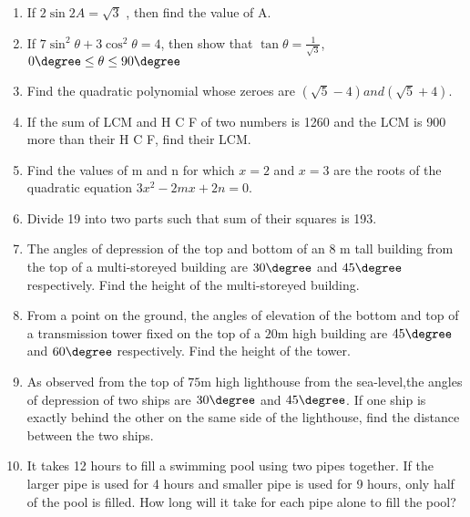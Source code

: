 \documentclass{article}
\begin{document}
\begin{enumerate}
\item If $2\sin2A=\sqrt{3}$ , then find the value of A.
\item If $7\sin^2\theta + 3\cos^2\theta = 4$, then show that $\tan\theta= \frac{1}{\sqrt{3}}$, $0\degree \le \theta\le 90\degree$

\item Find the quadratic polynomial whose zeroes are $(\sqrt{5}-4) and (\sqrt{5}+4)$.

\item If the sum of LCM and H C F of two numbers is 1260 and the LCM is 900 more than their H C F, find their LCM.

\item Find the values of m and n for which $x=2$ and $x=3$ are the roots of the quadratic equation $3x^2-2mx+2n=0$.

\item Divide 19 into two parts such that sum of their squares is 193.

\item The angles of depression of the top and bottom of an $8$ m tall building from the top of a multi-storeyed building are $30\degree$ and $45\degree$ respectively. Find the height of the multi-storeyed building.

\item From a point on the ground, the angles of elevation of the bottom and top of a transmission tower fixed on the top of a $20$m high building are $45\degree$ and $60\degree$ respectively. Find the height of the tower.

\item As observed from the top of $75$m high lighthouse from the sea-level,the angles of depression of two ships are $30\degree$ and  $45\degree$. If one ship is exactly behind the other on the same side of the lighthouse, find the distance between the two ships.

\item It takes 12 hours to fill a swimming pool using two pipes together. If the larger pipe is used for 4 hours and smaller pipe is used for 9 hours, only half of the pool is filled. How long will it take for each pipe alone to fill the  pool? 

\end{enumerate}
\end{document}
